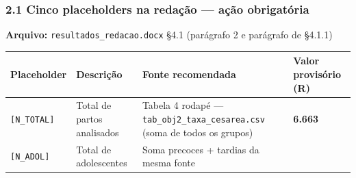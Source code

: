 \documentclass[
]{article}
\begin{document}
\hypertarget{cinco-placeholders-na-redauxe7uxe3o-auxe7uxe3o-obrigatuxf3ria}{%
\subsubsection{2.1 Cinco placeholders na redação --- ação
obrigatória}\label{cinco-placeholders-na-redauxe7uxe3o-auxe7uxe3o-obrigatuxf3ria}}

\textbf{Arquivo:} \texttt{resultados\_redacao.docx} §4.1 (parágrafo 2 e
parágrafo de §4.1.1)

\begin{longtable}[]{@{}llll@{}}
\toprule
\begin{minipage}[b]{0.22\columnwidth}\raggedright
Placeholder\strut
\end{minipage} & \begin{minipage}[b]{0.22\columnwidth}\raggedright
Descrição\strut
\end{minipage} & \begin{minipage}[b]{0.22\columnwidth}\raggedright
Fonte recomendada\strut
\end{minipage} & \begin{minipage}[b]{0.22\columnwidth}\raggedright
Valor provisório (R)\strut
\end{minipage}\tabularnewline
\midrule
\endhead
\begin{minipage}[t]{0.22\columnwidth}\raggedright
\texttt{{[}N\_TOTAL{]}}\strut
\end{minipage} & \begin{minipage}[t]{0.22\columnwidth}\raggedright
Total de partos analisados\strut
\end{minipage} & \begin{minipage}[t]{0.22\columnwidth}\raggedright
Tabela 4 rodapé --- \texttt{tab\_obj2\_taxa\_cesarea.csv} (soma de todos
os grupos)\strut
\end{minipage} & \begin{minipage}[t]{0.22\columnwidth}\raggedright
\textbf{6.663}\strut
\end{minipage}\tabularnewline
\begin{minipage}[t]{0.22\columnwidth}\raggedright
\texttt{{[}N\_ADOL{]}}\strut
\end{minipage} & \begin{minipage}[t]{0.22\columnwidth}\raggedright
Total de adolescentes\strut
\end{minipage} & \begin{minipage}[t]{0.22\columnwidth}\raggedright
Soma precoces + tardias da mesma fonte\strut

\end{minipage}
\end{longtable}
\end{document}
